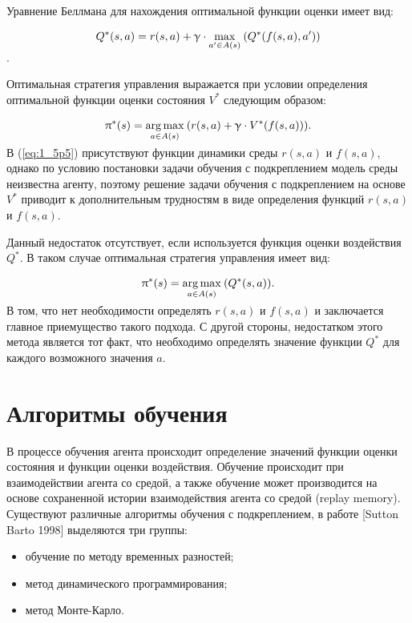 Уравнение Беллмана для нахождения оптимальной функции оценки имеет вид:

$$ Q^*(s, a) = r(s, a) + \gamma\cdot\smash{\displaystyle\max_{a' \in A(s)}} \: (Q^*(f(s,a),a')) $$.

Оптимальная стратегия управления выражается при условии определения оптимальной функции оценки состояния $ V^* $ следующим образом:

\begin{equation}
\label{eq:1_5p5}
\begin{alignedat}{2}
\pi^*(s) = \smash{\displaystyle\argmax_{a \in A(s)}} \: (r(s, a) + \gamma \cdot V^*(f(s, a))).
\end{alignedat}
\end{equation}

В (\ref{eq:1_5p5}) присутствуют функции динамики среды $ r(s, a) $ и $ f(s, a) $, однако по условию постановки задачи обучения с подкреплением модель среды неизвестна агенту, поэтому решение задачи обучения с подкреплением на основе $ V^* $ приводит к дополнительным трудностям в виде определения функций $ r(s, a) $ и $ f(s, a) $.

Данный недостаток отсутствует, если используется функция оценки воздействия $ Q^* $. В таком случае оптимальная стратегия управления имеет вид:

\begin{equation}
\label{eq:1_5p6}
\begin{alignedat}{2}
\pi^*(s) = \smash{\displaystyle\argmax_{a \in A(s)}} \: (Q^*(s, a)).
\end{alignedat}
\end{equation}

В том, что нет необходимости определять $ r(s, a) $ и $ f(s, a) $ и заключается главное приемущество такого подхода. С другой стороны, недостатком этого метода является тот факт, что необходимо определять значение функции $ Q^* $ для каждого возможного значения $ a $. 

\section{Алгоритмы обучения} \label{sect1_6}

В процессе обучения агента происходит определение значений функции оценки состояния и функции оценки воздействия. Обучение происходит при взаимодействии агента со средой, а также обучение может производится на основе сохраненной истории взаимодействия агента со средой (replay memory). Существуют различные алгоритмы обучения с подкреплением, в работе [Sutton Barto 1998] выделяются три группы:
\begin{itemize}
	\item обучение по методу временных разностей;
	\item метод динамического программирования;
	\item метод Монте-Карло.
\end{itemize}



